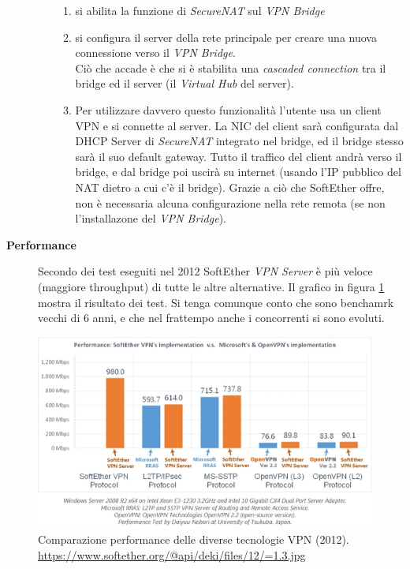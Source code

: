 \begin{description}
\begin{itemize}
\begin{enumerate}
      \item si abilita la funzione di \textit{SecureNAT} sul \textit{VPN Bridge}
      \item si configura il server della rete principale per creare una nuova connessione verso il \textit{VPN Bridge}.\\
      Ciò che accade è che si è stabilita una \textit{cascaded connection} tra il bridge ed il server (il \textit{Virtual Hub}
      del server).
      \item Per utilizzare davvero questo funzionalità l'utente usa un client VPN e si connette al server. La NIC
      del client sarà configurata dal DHCP Server di \textit{SecureNAT} integrato nel bridge,
      ed il bridge stesso sarà il suo default gateway. Tutto il traffico del client andrà verso il bridge, e dal bridge poi
      uscirà su internet (usando l'IP pubblico del NAT dietro a cui c'è il bridge). Grazie a ciò che SoftEther offre,
      non è necessaria alcuna configurazione nella rete remota (se non l'installazone del \textit{VPN Bridge}).
    \end{enumerate}
  \end{itemize}
  \item[\textbf{Performance}]Secondo dei test eseguiti nel 2012 SoftEther \textit{VPN Server} è più veloce (maggiore throughput) di tutte le
  altre alternative. Il grafico in figura \ref{fig:softether-performance} mostra il risultato dei test. Si tenga comunque
  conto che sono benchamrk vecchi di 6 anni, e che nel frattempo anche i concorrenti si sono evoluti.
\end{description}
\begin{figure}
  \includegraphics[scale=0.4]{img/softether_perf}
  \caption[Comparazione performance delle diverse tecnologie VPN]{
    Comparazione performance delle diverse tecnologie VPN (2012).
    \url{https://www.softether.org/@api/deki/files/12/=1.3.jpg}}
  \label{fig:softether-performance}
\end{figure}

